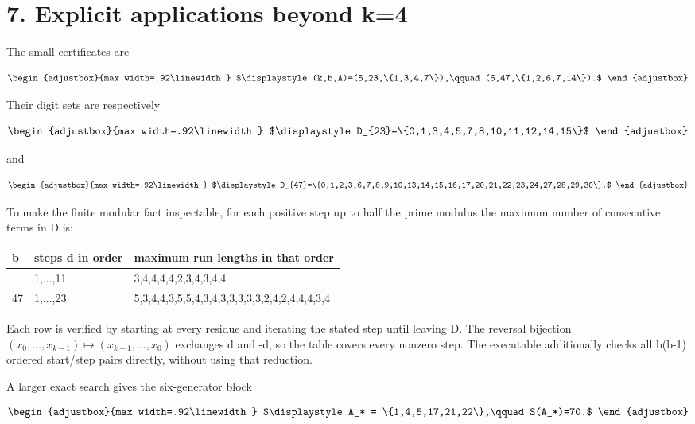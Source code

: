 \section{7. Explicit applications beyond k=4}\label{n03-explicit-applications-beyond-k4}

The small certificates are

\[
\begin{adjustbox}{max width=.92\linewidth}
$\displaystyle (k,b,A)=(5,23,\{1,3,4,7\}),\qquad
(6,47,\{1,2,6,7,14\}).$
\end{adjustbox}
\]

Their digit sets are respectively

\[
\begin{adjustbox}{max width=.92\linewidth}
$\displaystyle D_{23}=\{0,1,3,4,5,7,8,10,11,12,14,15\}$
\end{adjustbox}
\]

and

\[
\begin{adjustbox}{max width=.92\linewidth}
$\displaystyle D_{47}=\{0,1,2,3,6,7,8,9,10,13,14,15,16,17,20,21,22,23,24,27,28,29,30\}.$
\end{adjustbox}
\]

To make the finite modular fact inspectable, for each positive step up to half the prime modulus the maximum number of consecutive terms in D is:

\begin{longtable}[]{@{}lll@{}}
\toprule\noalign{}
b & steps d in order & maximum run lengths in that order \\
\midrule\noalign{}
\endhead
\bottomrule\noalign{}
\endlastfoot
23 & 1,...,11 & 3,4,4,4,4,2,3,4,3,4,4 \\
47 & 1,...,23 & 5,3,4,4,3,5,5,4,3,4,3,3,3,3,3,2,4,2,4,4,4,3,4 \\
\end{longtable}

Each row is verified by starting at every residue and iterating the stated step until leaving D. The reversal bijection \((x_0,...,x_{k-1})\mapsto(x_{k-1},...,x_0)\) exchanges d and -d, so the table covers every nonzero step. The executable additionally checks all b(b-1) ordered start/step pairs directly, without using that reduction.

A larger exact search gives the six-generator block

\[
\begin{adjustbox}{max width=.92\linewidth}
$\displaystyle A_* = \{1,4,5,17,21,22\},\qquad S(A_*)=70.$
\end{adjustbox}
\]

